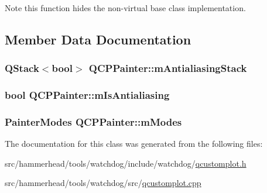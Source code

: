 \begin{DoxyNote}{Note}
this function hides the non-\/virtual base class implementation. 
\end{DoxyNote}


\subsection{Member Data Documentation}
\subsubsection[{\texorpdfstring{m\+Antialiasing\+Stack}{mAntialiasingStack}}]{\setlength{\rightskip}{0pt plus 5cm}Q\+Stack$<$bool$>$ Q\+C\+P\+Painter\+::m\+Antialiasing\+Stack\hspace{0.3cm}{\ttfamily [protected]}}\hypertarget{classQCPPainter_a0189e641bbf7dc31ac15aef7b36501fa}{}\label{classQCPPainter_a0189e641bbf7dc31ac15aef7b36501fa}
\subsubsection[{\texorpdfstring{m\+Is\+Antialiasing}{mIsAntialiasing}}]{\setlength{\rightskip}{0pt plus 5cm}bool Q\+C\+P\+Painter\+::m\+Is\+Antialiasing\hspace{0.3cm}{\ttfamily [protected]}}\hypertarget{classQCPPainter_a7055085da176aee0f6b23298f1003d08}{}\label{classQCPPainter_a7055085da176aee0f6b23298f1003d08}
\subsubsection[{\texorpdfstring{m\+Modes}{mModes}}]{\setlength{\rightskip}{0pt plus 5cm}Painter\+Modes Q\+C\+P\+Painter\+::m\+Modes\hspace{0.3cm}{\ttfamily [protected]}}\hypertarget{classQCPPainter_af5d1d6e5df0adbc7de5633250fb3396c}{}\label{classQCPPainter_af5d1d6e5df0adbc7de5633250fb3396c}


The documentation for this class was generated from the following files\+:\begin{DoxyCompactItemize}
\item 
src/hammerhead/tools/watchdog/include/watchdog/\hyperlink{qcustomplot_8h}{qcustomplot.\+h}\item 
src/hammerhead/tools/watchdog/src/\hyperlink{qcustomplot_8cpp}{qcustomplot.\+cpp}\end{DoxyCompactItemize}
